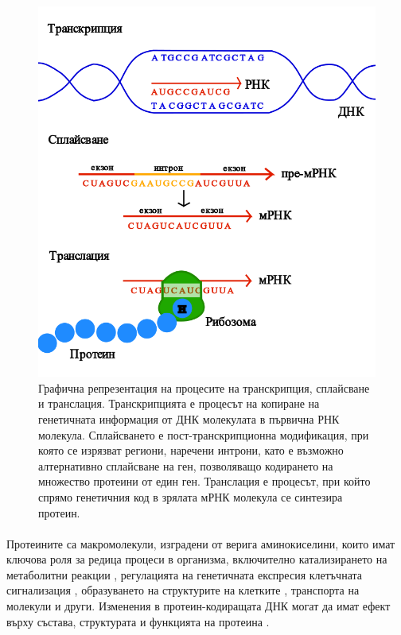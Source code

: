 \documentclass[pdftex,cyrillic,14pt,a4page,twoside,openright]{extreport}
\begin{document}
\begin{figure}[htp]
  \centering
  \includegraphics[width=12cm]{figures/transcription_splicing_translation}
  \caption {Графична репрезентация на процесите на транскрипция, сплайсване и транслация. Транскрипцията е процесът на копиране на генетичната информация от ДНК молекулата в първична РНК молекула. Сплайсването е пост-транскрипционна модификация, при която се изрязват региони, наречени интрони, като е възможно алтернативно сплайсване на ген, позволяващо кодирането на множество протеини от един ген. Транслация е процесът, при който спрямо генетичния код в зрялата мРНК молекула се синтезира протеин.}
  \label{fig:transcription_splicing_translation}
\end{figure}

\paragraph{}
Протеините са макромолекули, изградени от верига аминокиселини, които имат ключова роля за редица процеси в организма, включително катализирането на метаболитни реакции \cite{berg2002}, регулацията на генетичната експресия \cite{hinnebusch2005} клетъчната сигнализация \cite{calderwood2007}, образуването на структурите на клетките \cite{erickson2007}, транспорта на молекули \cite{wittenberg2007} и други. Изменения в протеин-кодиращата ДНК могат да имат ефект върху състава, структурата и функцията на протеина \cite{vihinen2021}.
\end{document}
